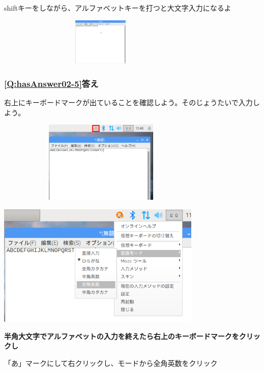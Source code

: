 \documentclass[a4paper,12pt]{jarticle}
\begin{document}
shiftキーをしながら、アルファベットキーを打つと大文字入力になるよ


\centering
\includegraphics[width=10.031cm,height=2.27cm]{textbook-img217.png}
\flushleft

\clearpage\subsubsection{\bfseries
\ref*{Q:hasAnswer02-5}答え}

右上にキーボードマークが出ていることを確認しよう。そのじょうたいで入力しよう。


\bigskip


\centering
\includegraphics[width=10.075cm,height=3.914cm]{textbook-img218.png}
\flushleft


\bigskip





\centering
\includegraphics[width=9.733cm,height=5.851cm]{textbook-img219.png}
\flushleft


\bigskip

{\bfseries
  半角大文字でアルファベットの入力を終えたら右上のキーボードマークをクリックし

  「あ」マークにして右クリックし、モードから全角英数をクリック}
\end{document}
